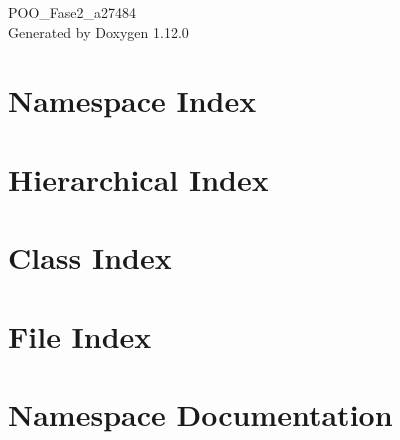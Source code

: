 \documentclass[twoside]{book}
\newcommand{\+}{\discretionary{\mbox{\scriptsize$\hookleftarrow$}}{}{}}
\newcommand{\clearemptydoublepage}{%
    \newpage{\pagestyle{empty}\cleardoublepage}%
  }
\begin{document}
  \raggedbottom
    \hypersetup{pageanchor=false,
                bookmarksnumbered=true,
                pdfencoding=unicode
               }
  \begin{titlepage}
  \vspace*{7cm}
  \begin{center}%
  {\Large POO\+\_\+\+Fase2\+\_\+a27484}\\
  \vspace*{1cm}
  {\large Generated by Doxygen 1.12.0}\\
  \end{center}
  \end{titlepage}
  \clearemptydoublepage
  \tableofcontents
  \clearemptydoublepage
  \hypersetup{pageanchor=true}
\chapter{Namespace Index}

\chapter{Hierarchical Index}

\chapter{Class Index}

\chapter{File Index}

\chapter{Namespace Documentation}




\end{document}
